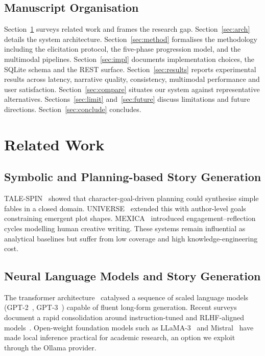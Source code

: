 \documentclass[conference,10pt,a4paper]{IEEEtran}
\begin{document}
\subsection{Manuscript Organisation}
Section~\ref{sec:related} surveys related work and frames the research
gap. Section~\ref{sec:arch} details the system architecture.
Section~\ref{sec:method} formalises the methodology including the
elicitation protocol, the five-phase progression model, and the
multimodal pipelines. Section~\ref{sec:impl} documents implementation
choices, the SQLite schema and the REST surface.
Section~\ref{sec:results} reports experimental results across latency,
narrative quality, consistency, multimodal performance and user
satisfaction. Section~\ref{sec:compare} situates our system against
representative alternatives. Sections~\ref{sec:limit}
and~\ref{sec:future} discuss limitations and future directions.
Section~\ref{sec:conclude} concludes.

\section{Related Work}\label{sec:related}

\subsection{Symbolic and Planning-based Story Generation}
TALE-SPIN~\cite{meehan1977talespin} showed that character-goal-driven
planning could synthesise simple fables in a closed domain.
UNIVERSE~\cite{lebowitz1985universe} extended this with author-level
goals constraining emergent plot shapes.
MEXICA~\cite{perezperez2001mexica} introduced engagement--reflection
cycles modelling human creative writing. These systems remain
influential as analytical baselines but suffer from low coverage and
high knowledge-engineering cost.

\subsection{Neural Language Models and Story Generation}
The transformer architecture~\cite{vaswani2017attention} catalysed a
sequence of scaled language models (GPT-2~\cite{radford2019gpt2},
GPT-3~\cite{brown2020gpt3}) capable of fluent long-form generation.
Recent surveys~\cite{naveed2024llmsurvey,zhao2023llmsurvey} document a
rapid consolidation around instruction-tuned and RLHF-aligned
models~\cite{openai2023gpt4,ouyang2022rlhf}. Open-weight foundation
models such as LLaMA-3~\cite{touvron2023llama} and
Mistral~\cite{jiang2023mistral} have made local inference practical
for academic research, an option we exploit through the Ollama
provider.
\end{document}

